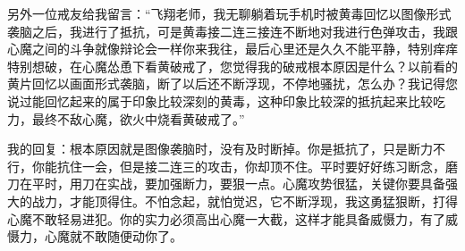 \begin{case}
    另外一位戒友给我留言：“飞翔老师，我无聊躺着玩手机时被黄毒回忆以图像形式袭脑之后，我进行了抵抗，可是黄毒接二连三接连不断地对我进行色弹攻击，我跟心魔之间的斗争就像辩论会一样你来我往，最后心里还是久久不能平静，特别痒痒特别想破，在心魔怂恿下看黄破戒了，您觉得我的破戒根本原因是什么？以前看的黄片回忆以画面形式袭脑，断了以后还不断浮现，不停地骚扰，怎么办？我记得您说过能回忆起来的属于印象比较深刻的黄毒，这种印象比较深的抵抗起来比较吃力，最终不敌心魔，欲火中烧看黄破戒了。”

    我的回复：根本原因就是图像袭脑时，没有及时断掉。你是抵抗了，只是断力不行，你能抗住一会，但是接二连三的攻击，你却顶不住。平时要好好练习断念，磨刀在平时，用刀在实战，要加强断力，要狠一点。心魔攻势很猛，关键你要具备强大的战力，才能顶得住。不怕念起，就怕觉迟，它不断浮现，我这勇猛狠断，打得心魔不敢轻易进犯。你的实力必须高出心魔一大截，这样才能具备威慑力，有了威慑力，心魔就不敢随便动你了。
\end{case}

